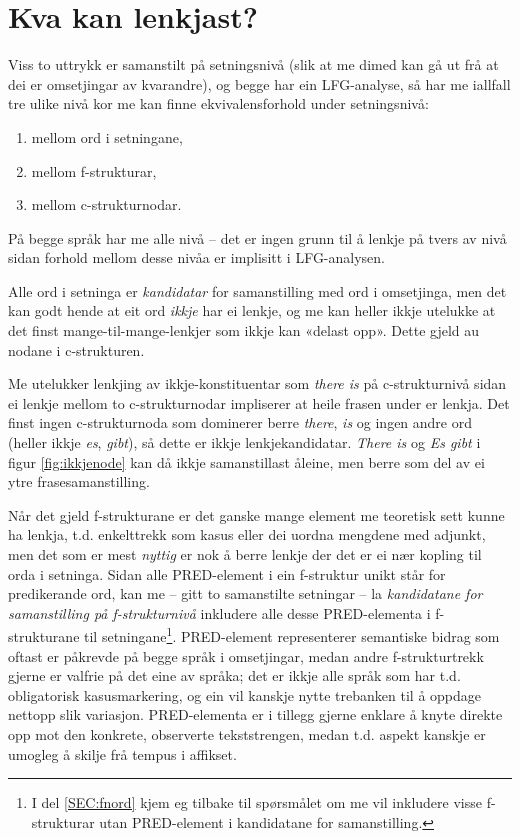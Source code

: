 \documentclass[11pt,a4paper,oneside,draft]{book}
\begin{document}
\section{Kva kan lenkjast?}
\label{sec-3.4}

\label{SEC:kandidatar}

Viss to uttrykk er samanstilt på setningsnivå (slik at me dimed kan gå
ut frå at dei er omsetjingar av kvarandre), og begge har ein
LFG-analyse, så har me iallfall tre ulike nivå kor me kan finne
ekvivalensforhold under setningsnivå:
\begin{enumerate}
\item mellom ord i setningane,
\item mellom f-strukturar,
\item mellom c-strukturnodar.
\end{enumerate}
På begge språk har me alle nivå -- det er ingen grunn til å lenkje på
tvers av nivå sidan forhold mellom desse nivåa er implisitt i
LFG-analysen.

Alle ord i setninga er \emph{kandidatar} for samanstilling med ord i
omsetjinga, men det kan godt hende at eit ord \emph{ikkje} har ei lenkje,
og me kan heller ikkje utelukke at det finst mange-til-mange-lenkjer
som ikkje kan «delast opp». Dette gjeld au nodane i c-strukturen.

Me utelukker lenkjing av ikkje-konstituentar som \emph{there is} på
c-strukturnivå sidan ei lenkje mellom to c-strukturnodar impliserer at
heile frasen under er lenkja. Det finst ingen c-strukturnoda som
dominerer berre \emph{there}, \emph{is} og ingen andre ord (heller ikkje \emph{es},
\emph{gibt}), så dette er ikkje lenkjekandidatar.  \emph{There is} og \emph{Es gibt}
i figur \ref{fig:ikkjenode} kan då ikkje samanstillast åleine, men
berre som del av ei ytre frasesamanstilling.

Når det gjeld f-strukturane er det ganske mange element me teoretisk
sett kunne ha lenkja, t.d. enkelttrekk som kasus eller dei uordna
mengdene med adjunkt, men det som er mest \emph{nyttig} er nok å berre
lenkje der det er ei nær kopling til orda i setninga. Sidan alle
PRED-element i ein f-struktur unikt står for predikerande ord, kan me
-- gitt to samanstilte setningar -- la \emph{kandidatane for
samanstilling på f-strukturnivå} inkludere alle desse PRED-elementa i
f-strukturane til setningane\footnote{I del \ref{SEC:fnord} kjem eg tilbake til spørsmålet om me vil
        inkludere visse f-strukturar utan PRED-element i kandidatane
        for samanstilling. }. PRED-element representerer
semantiske bidrag som oftast er påkrevde på begge språk i omsetjingar,
medan andre f-strukturtrekk gjerne er valfrie på det eine av språka;
det er ikkje alle språk som har t.d. obligatorisk kasusmarkering, og
ein vil kanskje nytte trebanken til å oppdage nettopp slik variasjon.
 PRED-elementa er i tillegg
gjerne enklare å knyte direkte opp mot den konkrete, observerte
tekststrengen, medan t.d. aspekt kanskje er umogleg å skilje frå
tempus i affikset.
\end{document}
